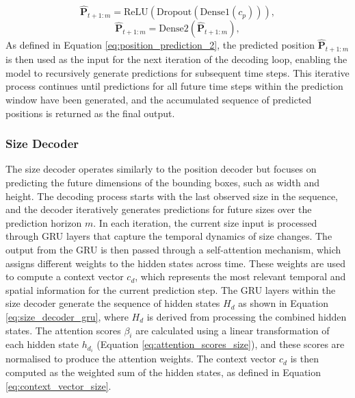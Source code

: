 \documentclass[12pt,oneside]{book} %
\begin{document}
\begin{equation}
    \hat{\mathbf{P}}_{t+1:m} = \text{ReLU}(\text{Dropout}(\text{Dense}1(c_p))), \label{eq:position_prediction_1}
\end{equation}
\begin{equation}
    \hat{\mathbf{P}}_{t+1:m} = \text{Dense}2(\hat{\mathbf{P}}_{t+1:m}), \label{eq:position_prediction_2}
\end{equation}
As defined in Equation \eqref{eq:position_prediction_2}, the predicted position \(\hat{\mathbf{P}}_{t+1:m}\) is then used as the input
for the next iteration of the decoding loop, enabling the model to recursively
generate predictions for subsequent time steps. This iterative process
continues until predictions for all future time steps within the prediction
window have been generated, and the accumulated sequence of predicted positions
is returned as the final output.

\subsubsection*{Size Decoder}
\noindent The size decoder operates similarly to the position decoder but focuses on
predicting the future dimensions of the bounding boxes, such as width and
height. The decoding process starts with the last observed size in the
sequence, and the decoder iteratively generates predictions for future sizes
over the prediction horizon \(m\). In each iteration, the current size input is
processed through GRU layers that capture the temporal dynamics of size
changes. The output from the GRU is then passed through a self-attention
mechanism, which assigns different weights to the hidden states across time.
These weights are used to compute a context vector \(c_d\), which represents
the most relevant temporal and spatial information for the current prediction
step. The GRU layers within the size decoder generate the sequence of hidden
states \(H_d\) as shown in Equation \eqref{eq:size_decoder_gru}, where \(H_d\)
is derived from processing the combined hidden states. The attention scores
\(\beta_i\) are calculated using a linear transformation of each hidden state
\(h_{d_i}\) (Equation \eqref{eq:attention_scores_size}), and these scores are
normalised to produce the attention weights. The context vector \(c_d\) is then
computed as the weighted sum of the hidden states, as defined in Equation
\eqref{eq:context_vector_size}.
\end{document}
